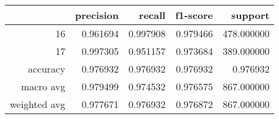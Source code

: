 \begin{table}[h]
\centering
\label{table:5}
\begin{tabular}{rrrrr}
\toprule
 & precision & recall & f1-score & support \\
\midrule
16 & 0.961694 & 0.997908 & 0.979466 & 478.000000 \\
17 & 0.997305 & 0.951157 & 0.973684 & 389.000000 \\
accuracy & 0.976932 & 0.976932 & 0.976932 & 0.976932 \\
macro avg & 0.979499 & 0.974532 & 0.976575 & 867.000000 \\
weighted avg & 0.977671 & 0.976932 & 0.976872 & 867.000000 \\
\bottomrule
\end{tabular}
\end{table}
